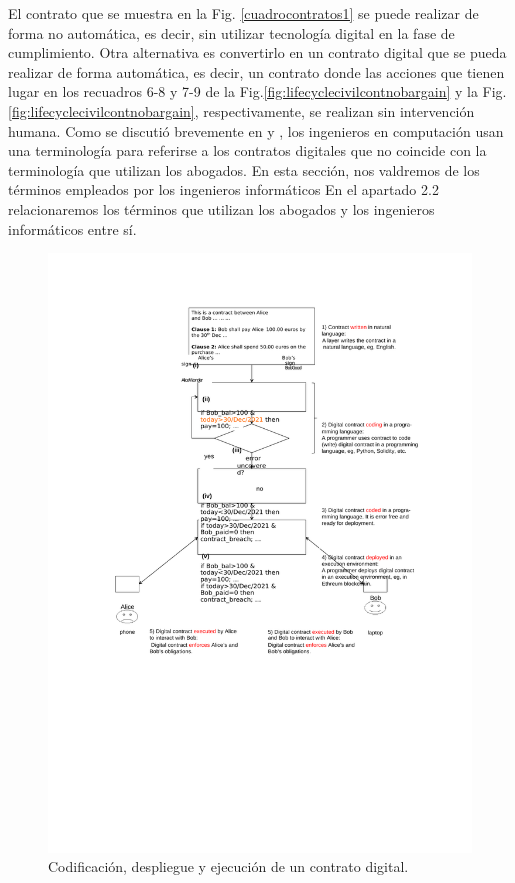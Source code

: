 \documentclass[12pt]{report} %
\begin{document}
El contrato que se muestra en la Fig. \ref{cuadrocontratos1} se puede realizar de forma no automática, es decir, sin utilizar tecnología digital en la fase de cumplimiento. Otra alternativa es convertirlo en un contrato digital que se pueda realizar de forma automática, es decir, un contrato donde  las acciones que tienen lugar en los recuadros 6-8 y 7-9 de la Fig.\ref{fig:lifecyclecivilcontnobargain}  y la Fig. \ref{fig:lifecyclecivilcontnobargain}, respectivamente, se realizan sin intervención humana. Como se discutió brevemente en \cite{Christopher2019} y \cite{Monika2019},  los ingenieros en computación usan una terminología para referirse a los contratos digitales que no coincide con la terminología que utilizan los abogados. En esta sección, nos valdremos de los términos empleados por los ingenieros informáticos En el apartado 2.2 relacionaremos los términos que utilizan los abogados y los ingenieros informáticos entre sí.



\begin{figure}
\centering
  \includegraphics[height=0.90\textheight] {codeejecd.pdf}
\caption{Codificación, despliegue y ejecución de un contrato digital.} 
\label{fig:licodeejecd}
\end{figure}
\end{document}
